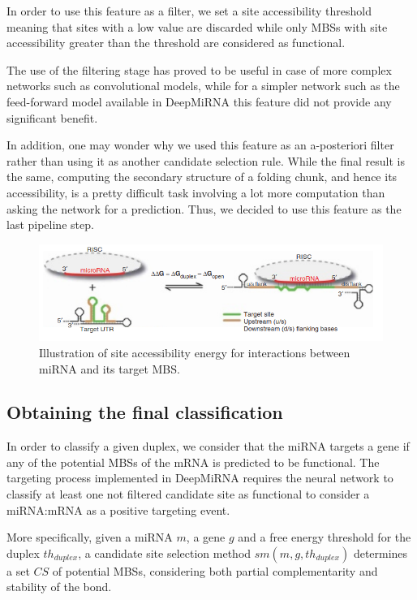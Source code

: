In order to use this feature as a filter, we set a site accessibility threshold meaning that sites with a low value are discarded while only MBSs with site accessibility greater than the threshold are considered as functional. 

The use of the filtering stage has proved to be useful in case of more complex networks such as convolutional models, while for a simpler network such as the feed-forward model available in DeepMiRNA this feature did not provide any significant benefit.

In addition, one may wonder why we used this feature as an a-posteriori filter rather than using it as another candidate selection rule. While the final result is the same, computing the secondary structure of a folding chunk, and hence its accessibility, is a pretty difficult task involving a lot more computation than asking the network for a prediction. Thus, we decided to use this feature as the last pipeline step.

\begin{figure}[hbt!]
	\centering
	\includegraphics[width=1\textwidth]{Figures/site_accessibility}
	\caption{ Illustration of site accessibility energy for interactions between miRNA and its target MBS.}
	\label{fig:site_accessibility}
\end{figure}

\subsection{Obtaining the final classification} \label{sub:prediction}
In order to classify a given duplex, we consider that the miRNA targets a gene if any of the potential MBSs of the mRNA is predicted to be functional. The targeting process implemented in DeepMiRNA requires the neural network to classify at least one not filtered candidate site as functional to consider a miRNA:mRNA as a positive targeting event. 

More specifically, given a miRNA $m$, a gene $g$ and a free energy threshold for the duplex $th_{duplex}$, a candidate site selection method $sm(m,g, th_{duplex})$ determines a set $CS$ of potential MBSs, considering both partial complementarity and stability of the bond. 

